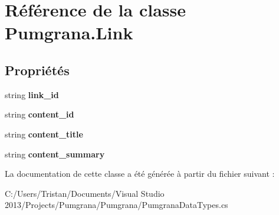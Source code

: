 \hypertarget{class_pumgrana_1_1_link}{\section{Référence de la classe Pumgrana.\+Link}
\label{class_pumgrana_1_1_link}
}
\subsection*{Propriétés}
\begin{DoxyCompactItemize}
\item 
\hypertarget{class_pumgrana_1_1_link_a046642f76528bddb4a4d43319f67883f}{string {\bfseries link\+\_\+id}}\label{class_pumgrana_1_1_link_a046642f76528bddb4a4d43319f67883f}

\item 
\hypertarget{class_pumgrana_1_1_link_a63ecd216f1e2d045d61f53ee76e10da0}{string {\bfseries content\+\_\+id}}\label{class_pumgrana_1_1_link_a63ecd216f1e2d045d61f53ee76e10da0}

\item 
\hypertarget{class_pumgrana_1_1_link_adb1fab17081838d1ea814b75da35f606}{string {\bfseries content\+\_\+title}}\label{class_pumgrana_1_1_link_adb1fab17081838d1ea814b75da35f606}

\item 
\hypertarget{class_pumgrana_1_1_link_ad76094a753753b0e2e7bd9433e61f1ee}{string {\bfseries content\+\_\+summary}}\label{class_pumgrana_1_1_link_ad76094a753753b0e2e7bd9433e61f1ee}

\end{DoxyCompactItemize}


La documentation de cette classe a été générée à partir du fichier suivant \+:\begin{DoxyCompactItemize}
\item 
C\+:/\+Users/\+Tristan/\+Documents/\+Visual Studio 2013/\+Projects/\+Pumgrana/\+Pumgrana/Pumgrana\+Data\+Types.\+cs\end{DoxyCompactItemize}
